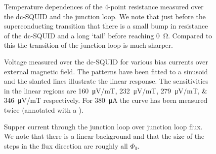 \begin{figure}[ht]
	\centering
	
	\caption{Temperature dependences of the 4-point resistance measured over the dc-SQUID and the junction loop. We note that just before the superconducting transition that there is a small bump in resistance of the dc-SQUID and a long `tail' before reaching \qty{0}{\ohm}. Compared to this the transition of the junction loop is much sharper.}
	\label{fig:CP2.6B_RT_curves}
\end{figure}


\begin{figure}[ht]
	\centering
	
	\caption{Voltage measured over the dc-SQUID for various bias currents over external magnetic field. The patterns have been fitted to a sinusoid and the slanted lines illustrate the linear response. The sensitivities in the linear regions are \qtylist{160;232;279;346}{\micro\volt/\milli\tesla} respectively. For \qty{380}{\micro\ampere} the curve has been measured twice (annotated with a \dag).}
	\label{fig:CP2.6B_SQUID_calibration_curves}
\end{figure}


\begin{figure}[ht]
	\centering
	
	\caption{Supper current through the junction loop over junction loop flux. We note that there is a linear background and that the size of the steps in the flux direction are roughly all $\Phi_0$.}
	\label{fig:CP2.6B_super_current_over_loop_flux}
\end{figure}


